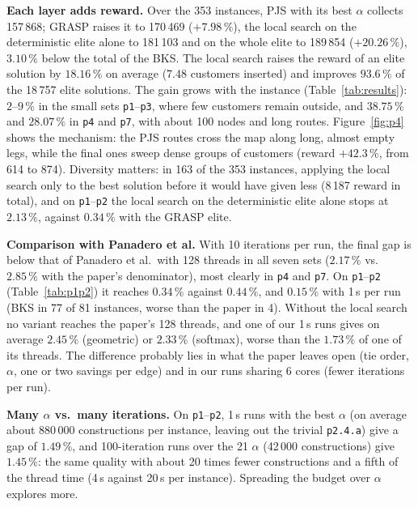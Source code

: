 \documentclass[10pt,a4paper]{article}
\begin{document}
\textbf{Each layer adds reward.} Over the 353 instances, PJS with its best $\alpha$ collects 157\,868;
GRASP raises it to 170\,469 ($+7.98\,\%$), the local search on the deterministic elite alone to 181\,103
and on the whole elite to 189\,854 ($+20.26\,\%$), $3.10\,\%$ below the total of the BKS. The local search
raises the reward of an elite solution by $18.16\,\%$ on average (7.48 customers inserted) and improves
$93.6\,\%$ of the 18\,757 elite solutions. The gain grows with the
instance (Table~\ref{tab:results}): $2$--$9\,\%$ in the small sets \texttt{p1}--\texttt{p3}, where few
customers remain outside, and $38.75\,\%$ and $28.07\,\%$ in \texttt{p4} and \texttt{p7}, with about
100 nodes and long routes. Figure~\ref{fig:p4} shows the mechanism: the PJS routes cross the map along
long, almost empty legs, while the final ones sweep dense groups of customers (reward $+42.3\,\%$, from 614 to 874). Diversity matters: in 163 of the 353 instances, applying the local search only to the best
solution before it would have given less (8\,187 reward in total), and on \texttt{p1}--\texttt{p2} the
local search on the deterministic elite alone stops at $2.13\,\%$, against $0.34\,\%$ with the GRASP
elite.

\textbf{Comparison with Panadero et al.} With 10 iterations per run, the final gap is below that of
Panadero et al.\ with 128 threads in all seven sets ($2.17\,\%$ vs.\ $2.85\,\%$ with the paper's denominator), most clearly in
\texttt{p4} and \texttt{p7}. On \texttt{p1}--\texttt{p2} (Table~\ref{tab:p1p2}) it reaches $0.34\,\%$ against
$0.44\,\%$, and $0.15\,\%$ with 1\,s per run (BKS in 77 of 81 instances, worse than the paper in 4). Without the local search no variant reaches the paper's 128 threads, and one of our 1\,s runs gives on
average $2.45\,\%$ (geometric) or $2.33\,\%$ (softmax), worse than the $1.73\,\%$ of one of its threads.
The difference probably lies in what the paper leaves open (tie order, $\alpha$, one or two savings per
edge) and in our runs sharing 6 cores (fewer iterations per run).

\textbf{Many $\alpha$ vs.\ many iterations.} On \texttt{p1}--\texttt{p2}, 1\,s runs with the best
$\alpha$ (on average about 880\,000 constructions per instance, leaving out the trivial \texttt{p2.4.a}) give a
gap of $1.49\,\%$, and 100-iteration runs over the 21 $\alpha$ (42\,000 constructions) give $1.45\,\%$: the same
quality with about 20 times fewer constructions and a fifth of the thread time (4\,s against 20\,s per
instance). Spreading the budget over $\alpha$ explores more.
\end{document}

